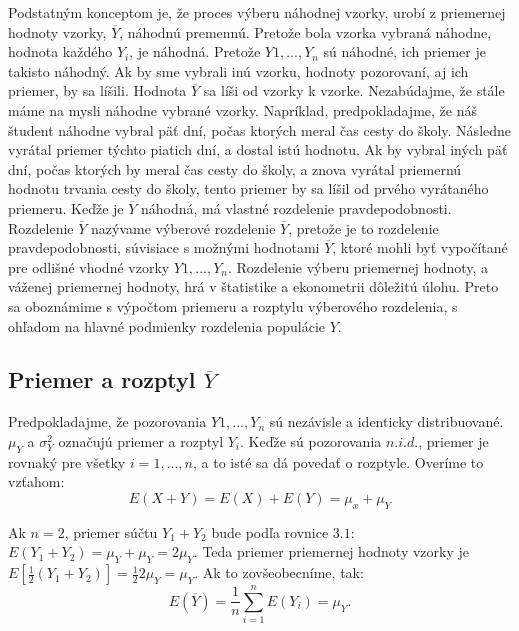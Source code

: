 \documentclass[]{tukediphc}
\begin{document}
Podstatným konceptom je, že proces výberu náhodnej vzorky, urobí z priemernej hodnoty vzorky, $\overline{Y}$, náhodnú premennú. Pretože bola vzorka vybraná náhodne, hodnota každého $Y_i$, je náhodná. Pretože $Y1, ..., Y_n$ sú náhodné, ich priemer je takisto náhodný. Ak by sme vybrali inú vzorku, hodnoty pozorovaní, aj ich priemer, by sa líšili. Hodnota $\overline{Y}$ sa líši od vzorky k vzorke. Nezabúdajme, že stále máme na mysli náhodne vybrané vzorky. Napríklad, predpokladajme, že náš študent náhodne vybral päť dní, počas ktorých meral čas cesty do školy. Následne vyrátal priemer týchto piatich dní, a dostal istú hodnotu. Ak by vybral iných päť dní, počas ktorých by meral čas cesty do školy, a znova vyrátal priemernú hodnotu trvania cesty do školy, tento priemer by sa líšil od prvého vyrátaného priemeru. Keďže je $\overline{Y}$ náhodná, má vlastné rozdelenie pravdepodobnosti. Rozdelenie $\overline{Y}$ nazývame výberové rozdelenie $\overline{Y}$, pretože je to rozdelenie pravdepodobnosti, súvisiace s možnými hodnotami $\overline{Y}$, ktoré mohli byť vypočítané pre odlišné vhodné vzorky $Y1, ..., Y_n$. Rozdelenie výberu priemernej hodnoty, a váženej priemernej hodnoty, hrá v štatistike a ekonometrii dôležitú úlohu. Preto sa oboznámime s výpočtom priemeru a rozptylu výberového rozdelenia, s ohľadom na hlavné podmienky rozdelenia populácie $Y$. 

\subsection{Priemer a rozptyl $\overline{Y}$ }

Predpokladajme, že pozorovania $Y1, ..., Y_n$ sú nezávisle a identicky distribuované. $\mu_Y$ a $\sigma^2_Y$ označujú priemer a rozptyl $Y_i$. Keďže sú pozorovania $n.i.d.$, priemer je rovnaký pre všetky $i = 1, ..., n$, a to isté sa dá povedať o rozptyle. Overíme to vzťahom:  
\begin{equation}
E(X+Y)=E(X)+E(Y)=\mu_x+\mu_Y    
\end{equation} 

Ak $n = 2$, priemer súčtu $Y_1 + Y_2$ bude podľa rovnice $3.1$: $E(Y_1+Y_2) = \mu_Y + \mu_Y = 2\mu_Y$. Teda priemer priemernej hodnoty vzorky je $E[\frac{1}{2}(Y_1 + Y_2)]= \frac{1}{2}2\mu_Y=\mu_Y$. Ak to zovšeobecníme, tak:
\begin{equation}
E(\overline{Y}) = \frac{1}{n}\sum_{i=1}^{n}E(Y_i) = \mu_Y.
\end{equation}
\end{document}
